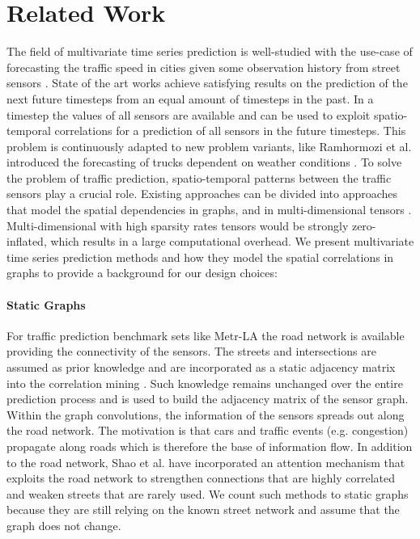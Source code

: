 
\section{\textbf{Related Work}}
\label{sec:related}

The field of multivariate time series prediction is well-studied with the use-case of forecasting the traffic speed in cities given some observation history from street sensors \cite{Yu18, Li2021, Lan22}. 
State of the art works achieve satisfying results on the prediction of the next future timesteps from an equal amount of timesteps in the past.
In a timestep the values of all sensors are available and can be used to exploit spatio-temporal correlations for a prediction of all sensors in the future timesteps. 
This problem is continuously adapted to new problem variants, like Ramhormozi et al. introduced the forecasting of trucks dependent on weather conditions \cite{Ramhormozi22}.
To solve the problem of traffic prediction, spatio-temporal patterns between the traffic sensors play a crucial role.
Existing approaches can be divided into approaches that model the spatial dependencies in graphs, and in multi-dimensional tensors \cite{choy20194d}. 
Multi-dimensional with high sparsity rates tensors would be strongly zero-inflated, which results in a large computational overhead.
We present multivariate time series prediction methods and how they model the spatial correlations in graphs to provide a background for our design choices:

\paragraph*{\textbf{Static Graphs}}
For traffic prediction benchmark sets like Metr-LA the road network is available providing the connectivity of the sensors. 
The streets and intersections are assumed as prior knowledge and are incorporated as a static adjacency matrix into the correlation mining \cite{Yu18, Zhou20}.
Such knowledge remains unchanged over the entire prediction process and is used to build the adjacency matrix of the sensor graph.
Within the graph convolutions, the information of the sensors spreads out along the road network.
The motivation is that cars and traffic events (e.g. congestion) propagate along roads which is therefore the base of information flow. 
In addition to the road network, Shao et al. \cite{Shao22} have incorporated an attention mechanism that exploits the road network to strengthen connections that are highly correlated and weaken streets that are rarely used. 
We count such methods to static graphs because they are still relying on the known street network and assume that the graph does not change.

